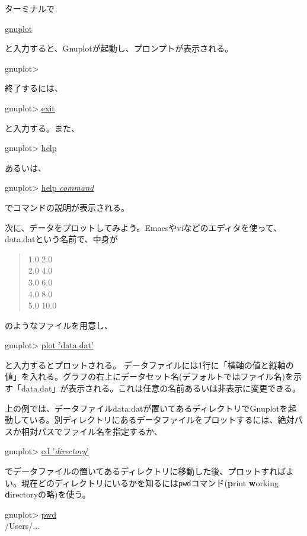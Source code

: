 ターミナルで
\begin{commandline2}
\prompt \underline{gnuplot}
\end{commandline2} \noindent
と入力すると、Gnuplotが起動し、プロンプトが表示される。
\begin{commandline2}
gnuplot>
\end{commandline2} \noindent
終了するには、
\begin{commandline2}
gnuplot> \underline{exit}
\end{commandline2} \noindent
と入力する。また、
\begin{commandline2}
gnuplot> \underline{help}
\end{commandline2} \noindent
あるいは、
\begin{commandline2}
gnuplot> \underline{help {\it command}}
\end{commandline2} \noindent
でコマンドの説明が表示される。

次に、データをプロットしてみよう。Emacsやviなどのエディタを使って、data.datという名前で、中身が
\begin{quote}
 1.0 2.0 \\
 2.0 4.0 \\
 3.0 6.0 \\
 4.0 8.0 \\
 5.0 10.0
\end{quote}
のようなファイルを用意し、
\begin{commandline2}
gnuplot> \underline{plot 'data.dat'}
\end{commandline2} \noindent
と入力するとプロットされる。 データファイルには1行に「横軸の値と縦軸の値」を入れる。グラフの右上にデータセット名(デフォルトではファイル名)を示す「data.dat」が表示される。これは任意の名前あるいは非表示に変更できる。

上の例では、データファイルdata.datが置いてあるディレクトリでGnuplotを起動している。別ディレクトリにあるデータファイルをプロットするには、絶対パスか相対パスでファイル名を指定するか、
\begin{commandline2}
gnuplot> \underline{cd '{\it directory}'}
\end{commandline2} \noindent
でデータファイルの置いてあるディレクトリに移動した後、プロットすればよい。現在どのディレクトリにいるかを知るには{\tt pwd}コマンド({\bf p}rint {\bf w}orking {\bf d}irectoryの略)を使う。
\begin{commandline2}
gnuplot> \underline{pwd}\\
/Users/...  
\end{commandline2} \noindent

